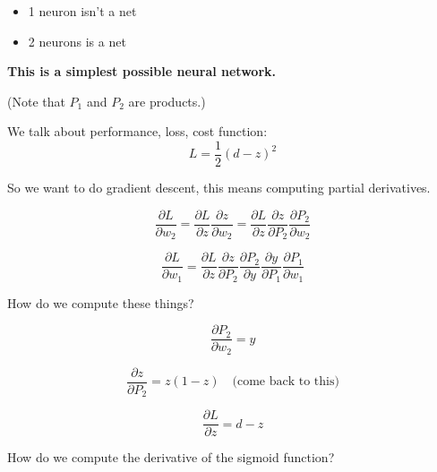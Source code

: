 
\usepackage{epsfig}





\begin{itemize}
\item 1 neuron isn't a net
\item 2 neurons is a  net
\end{itemize}

\textbf{This is a simplest possible neural network.}



(Note that $P_1$ and $P_2$ are products.)

We talk about performance, loss, cost function:
\begin{displaymath}
  L = \frac{1}{2} (d-z)^2
\end{displaymath}

So we want to do gradient descent, this means computing partial derivatives.

\begin{displaymath}
  \frac{\partial L}{\partial w_2}
  =
  \frac{\partial L}{\partial z}
  \frac{\partial z}{\partial w_2}
  =
  \frac{\partial L}{\partial z}
  \frac{\partial z}{\partial P_2}
  \frac{\partial P_2}{\partial w_2}
\end{displaymath}

\begin{displaymath}
  \frac{\partial L}{\partial w_1}
  =
  \frac{\partial L}{\partial z}
  \frac{\partial z}{\partial P_2}
  \frac{\partial P_2}{\partial y}
  \frac{\partial y}{\partial P_1}
  \frac{\partial P_1}{\partial w_1}
\end{displaymath}

How do we compute these things?

\begin{displaymath}
  \frac{\partial P_2}{\partial w_2} = y
\end{displaymath}

\begin{displaymath}
  \frac{\partial z}{\partial P_2} = z(1-z) \quad \mbox{(come back to this)}
\end{displaymath}

\begin{displaymath}
  \frac{\partial L}{\partial z} = d-z
\end{displaymath}

How do we compute the derivative of the sigmoid function?


